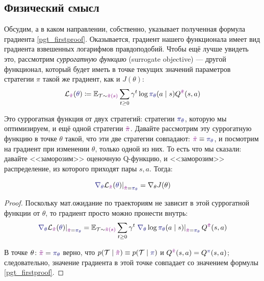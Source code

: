 \subsection{Физический смысл}

Обсудим, а в каком направлении, собственно, указывает полученная формула градиента \eqref{pgt_firstproof}. Оказывается, градиент нашего функционала имеет вид градиента взвешенных логарифмов правдоподобий. Чтобы ещё лучше увидеть это, рассмотрим \emph{суррогатную функцию} (surrogate objective) --- другой функционал, который будет иметь в точке текущих значений параметров стратегии $\pi$ такой же градиент, как и $J(\theta)$:
\begin{equation}\label{surrogateobj}
\mathcal{L}_{\textcolor{ChadPurple}{\tilde{\pi}}}(\textcolor{ChadBlue}{\theta}) \coloneqq \E_{\Traj \sim \textcolor{ChadPurple}{\tilde{\pi}(s)}} \sum_{t \ge 0} \gamma^t \log \textcolor{ChadBlue}{\pi_{\theta}}(a \mid s) Q^{\textcolor{ChadPurple}{\tilde{\pi}}}(s, a)
\end{equation}

Это суррогатная функция от двух стратегий: стратегии $\textcolor{ChadBlue}{\pi_{\theta}}$, которую мы оптимизируем, и ещё одной стратегии $\textcolor{ChadPurple}{\tilde{\pi}}$. Давайте рассмотрим эту суррогатную функцию в точке $\theta$ такой, что эти две стратегии совпадают: $\textcolor{ChadPurple}{\tilde{\pi}} \HM\equiv \textcolor{ChadBlue}{\pi_{\theta}}$, и посмотрим на градиент при изменении $\theta$, только одной из них. То есть что мы сказали: давайте <<заморозим>> оценочную Q-функцию, и <<заморозим>> распределение, из которого приходят пары $s, a$. Тогда:

\begin{proposition}
$$\left. \textcolor{ChadBlue}{\nabla_{\theta}} \mathcal{L}_{\textcolor{ChadPurple}{\tilde{\pi}}}(\textcolor{ChadBlue}{\theta}) \right|_{\textcolor{ChadPurple}{\tilde{\pi}} = \textcolor{ChadBlue}{\pi_{\theta}}} = \nabla_{\theta} J(\theta)$$
\begin{proof}
Поскольку мат.ожидание по траекториям не зависит в этой суррогатной функции от $\theta$, то градиент просто можно пронести внутрь:
$$\left. \textcolor{ChadBlue}{\nabla_{\theta}} \mathcal{L}_{\textcolor{ChadPurple}{\tilde{\pi}}}(\textcolor{ChadBlue}{\theta}) \right|_{\textcolor{ChadPurple}{\tilde{\pi}} = \textcolor{ChadBlue}{\pi_{\theta}}} = \E_{\Traj \sim \textcolor{ChadPurple}{\tilde{\pi}(s)}} \sum_{t \ge 0} \gamma^t \left. \textcolor{ChadBlue}{\nabla_{\theta}} \log \textcolor{ChadBlue}{\pi_{\theta}}(a \mid s) \right|_{\textcolor{ChadPurple}{\tilde{\pi}} = \textcolor{ChadBlue}{\pi_{\theta}}} Q^{\textcolor{ChadPurple}{\tilde{\pi}}}(s, a)$$

В точке $\theta \colon \textcolor{ChadPurple}{\tilde{\pi}} \HM= \textcolor{ChadBlue}{\pi_{\theta}}$ верно, что $p(\Traj \HM\mid \textcolor{ChadPurple}{\tilde{\pi}}) \HM\equiv p(\Traj \HM\mid \textcolor{ChadBlue}{\pi})$ и $Q^{\textcolor{ChadPurple}{\tilde{\pi}}}(s, a) \HM = Q^{\textcolor{ChadBlue}{\pi}}(s, a)$; следовательно, значение градиента в этой точке совпадает со значением формулы \eqref{pgt_firstproof}.
\end{proof}
\end{proposition}

